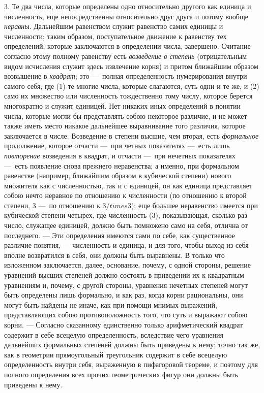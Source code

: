 3. Те два числа, которые определены одно относительно другого как единица и
численность, еще непосредственны относительно друг друга и потому вообще
{\em неравны}. Дальнейшим равенством служит равенство
самих единицы и численности; таким образом, поступательное движение к
равенству тех определений, которые заключаются в определении числа,
завершено. Считание согласно этому полному равенству есть
{\em возведение в степень} (отрицательным видом
исчисления служит здесь извлечение корня) и притом ближайшим образом
возвышение в {\em квадрат}; это —~полная определенность
нумерирования внутри самого себя, где (1) те многие числа, которые
слагаются, суть одни и те же, и (2) само их множество или численность
тождественно тому числу, которое берется многократно и служит единицей. Нет
никаких иных определений в понятии числа, которые могли бы представлять
собою некоторое различие, и не может также иметь место никакое дальнейшее
выравнивание того различия, которое заключается в числе. Возведение в
степени высшие, чем вторая, есть {\em формальное}
продолжение, которое отчасти —~при четных показателях —~есть лишь
{\em повторение} возведения в квадрат, и отчасти —~при
нечетных показателях —~есть появление снова прежнего неравенства; а именно,
при формальном равенстве (например, ближайшим образом в кубической степени)
нового множителя как с численностью, так и с единицей, он как единица
представляет собою нечто неравное по отношению к численности (по отношению
к второй степени, 3 —~по отношению к $3 /times 3$); еще большее неравенство имеется
при кубической степени четырех, где численность (3), показывающая, сколько
раз число, служащее единицей, должно быть помножено само на себя, отлична
от последнего. — Эти определения имеются сами по себе, как существенное
различие понятия, — численность и единица, и для того, чтобы выход из себя
вполне возвратился в себя, они должны быть выравнены. В только что
изложенном заключается, далее, основание, почему, с одной стороны, решение
уравнений высших степеней должно состоять в приведении их к квадратным
уравнениям и, почему, с другой стороны, уравнения нечетных степеней могут
быть определены лишь формально, и как раз, когда корни рациональны, они
могут быть найдены не иначе, как при помощи мнимых выражений,
представляющих собою противоположность того, что суть и выражают собою
корни. — Согласно сказанному единственно только арифметический квадрат
содержит в себе всецелую определенность, вследствие чего уравнения
дальнейших формальных степеней должны быть приведены к нему; точно так же,
как в геометрии прямоугольный треугольник содержит в себе всецелую
определенность внутри себя, выраженную в пифагоровой теореме, и поэтому для
полного определения всех прочих геометрических фигур они должны быть
приведены к нему.


